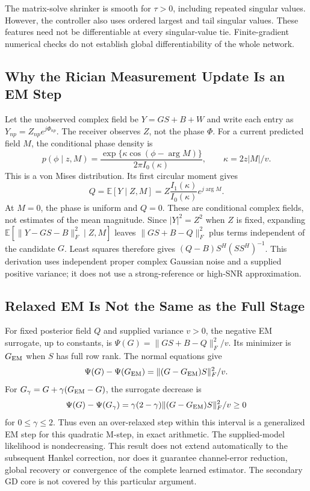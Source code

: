 \documentclass[journal]{IEEEtran}
\begin{document}
The matrix-solve shrinker is smooth for $\tau>0$, including repeated
singular values. However, the controller also uses ordered largest and
tail singular values. These features need not be differentiable at every
singular-value tie. Finite-gradient numerical checks do not establish
global differentiability of the whole network.

\subsection{Why the Rician Measurement Update Is an EM Step}
Let the unobserved complex field be $Y=GS+B+W$ and write each entry as
$Y_{np}=Z_{np}e^{j\Phi_{np}}$. The receiver observes $Z$, not the phase
$\Phi$. For a current predicted field $M$, the conditional phase density is
\begin{equation}
 p(\phi\mid z,M)=\frac{\exp\{\kappa\cos(\phi-\arg M)\}}
 {2\pi I_0(\kappa)},\qquad \kappa=2z|M|/v.
\end{equation}
This is a von Mises distribution. Its first circular moment gives
\begin{equation}
 Q=\mathbb E[Y\mid Z,M]=Z\frac{I_1(\kappa)}{I_0(\kappa)}e^{j\arg M}.
\end{equation}
At $M=0$, the phase is uniform and $Q=0$. These are conditional complex
fields, not estimates of the mean magnitude. Since $|Y|^2=Z^2$ when $Z$
is fixed, expanding $\mathbb E[\|Y-GS-B\|_F^2\mid Z,M]$ leaves
$\|GS+B-Q\|_F^2$ plus terms independent of the candidate $G$.
Least squares therefore gives $(Q-B)S^H(SS^H)^{-1}$. This derivation uses
independent proper complex Gaussian noise and a supplied positive variance;
it does not use a strong-reference or high-SNR approximation.

\subsection{Relaxed EM Is Not the Same as the Full Stage}
For fixed posterior field $Q$ and supplied variance $v>0$, the negative
EM surrogate, up to constants, is
$\Psi(G)=\|GS+B-Q\|_F^2/v$. Its minimizer is $G_{\rm EM}$ when $S$
has full row rank. The normal equations give
\begin{equation}
 \Psi(G)-\Psi(G_{\rm EM})=\|(G-G_{\rm EM})S\|_F^2/v.
\end{equation}
For $G_\gamma=G+\gamma(G_{\rm EM}-G)$, the surrogate decrease is
\begin{equation}
 \Psi(G)-\Psi(G_\gamma)=\gamma(2-\gamma)
 \|(G-G_{\rm EM})S\|_F^2/v\ge0
\end{equation}
for $0\le\gamma\le2$. Thus even an over-relaxed step within this
interval is a generalized EM step for this quadratic M-step, in exact
arithmetic. The supplied-model likelihood is nondecreasing. This result
does not extend automatically to the subsequent Hankel correction, nor
does it guarantee channel-error reduction, global recovery or convergence
of the complete learned estimator. The secondary GD core is not covered
by this particular argument.
\end{document}
